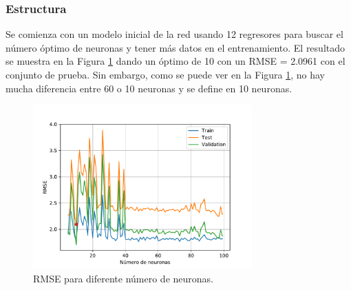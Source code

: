 \documentclass[12pt]{article}
\begin{document}
\subsubsection{Estructura}
Se comienza con un modelo inicial de la red usando 12 regresores para buscar el número óptimo de neuronas y tener más datos en el entrenamiento. El resultado se muestra en la Figura \ref{p2_neuronas} dando un óptimo de 10 con un RMSE = 2.0961 con el conjunto de prueba. Sin embargo, como se puede ver en la Figura \ref{p2_neuronas}, no hay mucha diferencia entre 60 o 10 neuronas y se define en 10 neuronas.
\begin{figure}[h!]
	\centering
	\captionsetup{justification=centering}
	 \includegraphics[width=0.75\textwidth]{imag/redes/RMSE_p2.pdf}
	\caption{RMSE para diferente número de neuronas.}
	\label{p2_neuronas}
\end{figure}
\end{document}
